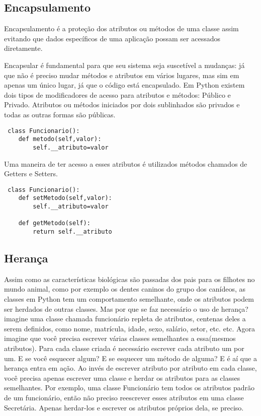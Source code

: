 \documentclass[11pt,a4paper]{article}
\begin{document}
\subsection{Encapsulamento}
Encapsulamento é a proteção dos atributos ou métodos de uma classe assim evitando 
que dados específicos de uma aplicação possam ser acessados diretamente.

Encapsular é fundamental para que seu sistema seja suscetível a mudanças: já que não é preciso mudar
métodos e atributos em vários lugares, mas sim em apenas um único lugar, já que o código está encapsulado.
Em Python existem dois tipos de modificadores de acesso para atributos e métodos: Público e Privado.
Atributos ou métodos iniciados por dois sublinhados são privados e todas as outras formas são públicas.
\begin{lstlisting}
 class Funcionario():
	def metodo(self,valor):
		self.__atributo=valor

\end{lstlisting} 

Uma maneira de ter acesso a esses atributos é utilizados métodos chamados de Getters e Setters.

\begin{lstlisting}
 class Funcionario():
	def setMetodo(self,valor):
		self.__atributo=valor

	def getMetodo(self):
		return self.__atributo
\end{lstlisting}

\subsection{Herança}
Assim como as características biológicas são passadas dos pais para os filhotes no mundo
animal, como por exemplo os dentes caninos do grupo dos canídeos, as classes em Python
tem um comportamento semelhante, onde os atributos podem ser herdados de outras
classes.
Mas por que se faz necessário o uso de herança? imagine uma classe chamada funcionário
repleta de atributos, centenas deles a serem definidos, como nome, matrícula, idade, sexo,
salário, setor, etc. etc. Agora imagine que você precisa escrever várias classes semelhantes
a essa(mesmos atributos). Para cada classe criada é necessário escrever cada atributo um
por um. E se você esquecer algum? E se esquecer um método de alguma? E é aí que a
herança entra em ação.
Ao invés de escrever atributo por atributo em cada classe, você precisa apenas escrever
uma classe e herdar os atributos para as classes semelhantes. Por exemplo, uma classe
Funcionário tem todos os atributos padrão de um funcionário, então não preciso reescrever
esses atributos em uma classe Secretária. Apenas herdar-los e escrever os atributos
próprios dela, se preciso.
\end{document}
